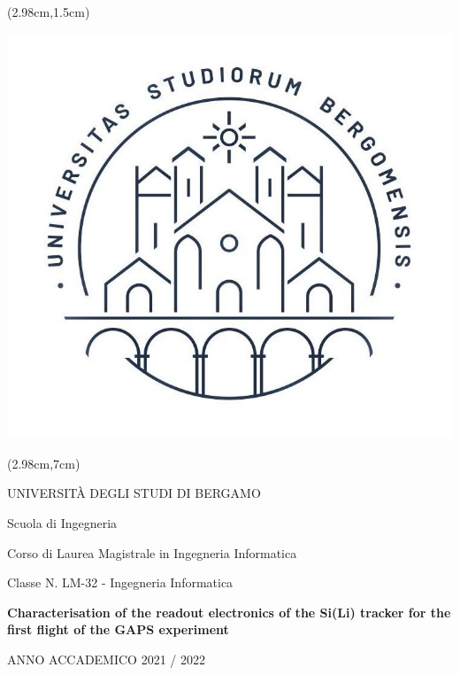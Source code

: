 \thispagestyle{empty}
\begin{textblock*}{\textwidth}(2.98cm,1.5cm)
    \begin{center}
        \includegraphics[scale=0.4]{Images/logo_unibg.jpg}  
    \end{center}
\end{textblock*}

\begin{textblock*}{\textwidth}(2.98cm,7cm)
    \begin{center}
        \large
        UNIVERSITÀ DEGLI STUDI DI BERGAMO
    \end{center}
    \begin{center}
        Scuola di Ingegneria
    \end{center}
    \vspace{-0.65cm}
    \begin{center}
        Corso di Laurea Magistrale in Ingegneria Informatica
    \end{center}
    \vspace{-0.65cm}
    \begin{center}
        Classe N. LM-32 - Ingegneria Informatica
    \end{center}
    \vspace{1cm}
    \begin{center}
        \LARGE
        \textbf{Characterisation of the readout electronics of the Si(Li) tracker for the first flight of the GAPS experiment}
    \end{center}
    \vspace{10.5cm}
    \begin{center}
         ANNO ACCADEMICO 2021 / 2022
    \end{center}
\end{textblock*}

